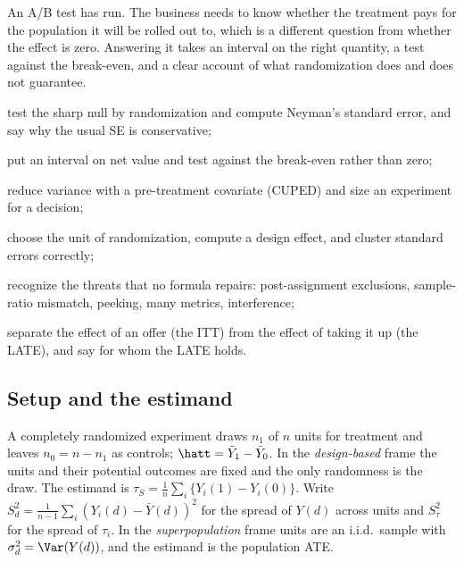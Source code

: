 \documentclass[11pt]{article}
\begin{document}

\begin{decision}
An A/B test has run. The business needs to know whether the treatment pays for the population it will be
rolled out to, which is a different question from whether the effect is zero. Answering it takes an interval
on the right quantity, a test against the break-even, and a clear account of what randomization does and
does not guarantee.
\end{decision}

\begin{goals}
  \item test the sharp null by randomization and compute Neyman's standard error, and say why the usual SE
  is conservative;
  \item put an interval on net value and test against the break-even rather than zero;
  \item reduce variance with a pre-treatment covariate (CUPED) and size an experiment for a decision;
  \item choose the unit of randomization, compute a design effect, and cluster standard errors correctly;
  \item recognize the threats that no formula repairs: post-assignment exclusions, sample-ratio mismatch,
  peeking, many metrics, interference;
  \item separate the effect of an offer (the ITT) from the effect of taking it up (the LATE), and say for whom the
  LATE holds.
\end{goals}

\sectionone

\subsection{Setup and the estimand}

A completely randomized experiment draws $n_1$ of $n$ units for treatment and leaves $n_0 = n - n_1$ as
controls; $\hatt = \bar Y_1 - \bar Y_0$. In the \emph{design-based} frame the units and their potential
outcomes are fixed and the only randomness is the draw. The estimand is
$\tau_S = \frac1n\sum_i \{Y_i(1) - Y_i(0)\}$. Write
$S_d^2 = \frac{1}{n-1}\sum_i (Y_i(d) - \bar Y(d))^2$ for the spread of $Y(d)$ across units and $S_\tau^2$ for
the spread of $\tau_i$. In the \emph{superpopulation} frame units are an i.i.d.\ sample with
$\sigma_d^2 = \Var(Y(d))$, and the estimand is the population ATE.
\end{document}
